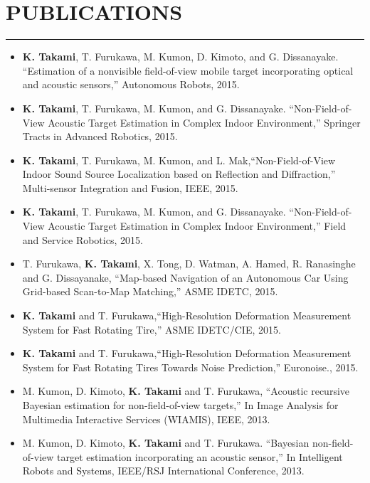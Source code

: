 \documentclass[11pt,letterpaper]{article}
\begin{document}
\section*{PUBLICATIONS}\vspace{-3mm}
\hrule
\begin{itemize}[label={}]
\item {\bf K. Takami}, T. Furukawa, M. Kumon, D. Kimoto, and G. Dissanayake. ``Estimation of a nonvisible field-of-view mobile target incorporating optical and acoustic sensors,'' Autonomous Robots, 2015.

\item {\bf K. Takami}, T. Furukawa, M. Kumon, and G. Dissanayake. ``Non-Field-of-View Acoustic Target Estimation in Complex Indoor Environment,'' Springer Tracts in Advanced Robotics, 2015.

\item  {\bf K. Takami}, T. Furukawa, M. Kumon, and L. Mak,``Non-Field-of-View Indoor Sound Source Localization based on Reflection and Diffraction,'' Multi-sensor Integration and Fusion, IEEE, 2015.

\item {\bf K. Takami}, T. Furukawa, M. Kumon, and G. Dissanayake. ``Non-Field-of-View Acoustic Target Estimation in Complex Indoor Environment,'' Field and Service Robotics, 2015.

\item  T. Furukawa, {\bf K. Takami}, X. Tong, D. Watman, A. Hamed, R. Ranasinghe and G. Dissayanake, ``Map-based Navigation of an Autonomous Car Using Grid-based Scan-to-Map Matching,'' ASME IDETC, 2015.

\item  {\bf K. Takami} and T. Furukawa,``High-Resolution Deformation Measurement System for Fast Rotating Tire,'' ASME IDETC/CIE, 2015.



\item  {\bf K. Takami} and T. Furukawa,``High-Resolution Deformation Measurement System for Fast Rotating Tires Towards Noise Prediction,'' Euronoise., 2015.

\item M. Kumon, D. Kimoto, {\bf K. Takami} and T. Furukawa, ``Acoustic recursive Bayesian estimation for non-field-of-view targets,'' In Image Analysis for Multimedia Interactive Services (WIAMIS), IEEE, 2013.

\item M. Kumon, D. Kimoto, {\bf K. Takami} and T. Furukawa. ``Bayesian non-field-of-view target estimation incorporating an acoustic sensor,'' In Intelligent Robots and Systems, IEEE/RSJ International Conference, 2013.


\end{itemize}
\end{document}
